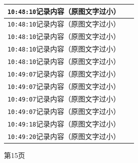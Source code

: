 \documentclass[UTF8,10pt,a4paper,fontset=fandol]{ctexart}
\newcommand{\fieldvalue}[1]{#1}
\begin{document}
\begin{minipage}[t]{0.48\linewidth}
\begin{tabular}{|p{0.20\linewidth}|p{0.72\linewidth}|}
\multicolumn{2}{|l|}{
\fieldvalue{\texttt{10:48:10}\quad 记录内容（原图文字过小）}} \\ \hline
\multicolumn{2}{|l|}{
\fieldvalue{\texttt{10:48:10}\quad 记录内容（原图文字过小）}} \\ \hline
\multicolumn{2}{|l|}{
\fieldvalue{\texttt{10:48:10}\quad 记录内容（原图文字过小）}} \\ \hline
\multicolumn{2}{|l|}{
\fieldvalue{\texttt{10:48:10}\quad 记录内容（原图文字过小）}} \\ \hline
\multicolumn{2}{|l|}{
\fieldvalue{\texttt{10:48:10}\quad 记录内容（原图文字过小）}} \\ \hline
\multicolumn{2}{|l|}{
\fieldvalue{\texttt{10:49:07}\quad 记录内容（原图文字过小）}} \\ \hline
\multicolumn{2}{|l|}{
\fieldvalue{\texttt{10:49:07}\quad 记录内容（原图文字过小）}} \\ \hline
\multicolumn{2}{|l|}{
\fieldvalue{\texttt{10:49:07}\quad 记录内容（原图文字过小）}} \\ \hline
\multicolumn{2}{|l|}{
\fieldvalue{\texttt{10:49:07}\quad 记录内容（原图文字过小）}} \\ \hline
\multicolumn{2}{|l|}{
\fieldvalue{\texttt{10:49:18}\quad 记录内容（原图文字过小）}} \\ \hline
\multicolumn{2}{|l|}{
\fieldvalue{\texttt{10:49:20}\quad 记录内容（原图文字过小）}} \\ \hline
\end{tabular}

\vspace{2pt}
第15页
\end{minipage}
\hfill
\end{document}

